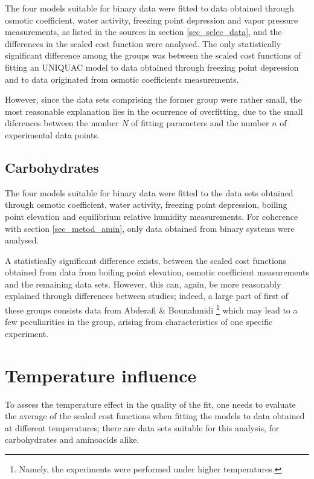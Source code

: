 \documentclass[
	12pt,				%
	openright,
	twoside,
	a4paper,			%
	brazil,			%
	french,				%
	english				%
	]{abntex2}
\begin{document}
\label{sec_metod_amin}

The four models suitable for binary data were fitted to data obtained through
osmotic coefficient, water activity, freezing point depression and vapor pressure
measurements, as listed in the sources in section \ref{sec_selec_data}, and the
differences in the scaled cost function were analysed. The only statistically
significant difference among the groups was between the scaled cost functions of
fitting an UNIQUAC model to data obtained through freezing point depression and
to data originated from osmotic coefficients measurements.

However, since the data sets comprising the former group were rather small, the
most reasonable explanation lies in the ocurrence of overfitting, due to the small
diferences between the number $N$ of fitting parameters and the number $n$ of
experimental data points.

\subsection{Carbohydrates}

The four models suitable for binary data were fitted to the data sets obtained
through osmotic coefficient, water activity, freezing point depression, boiling
point elevation and equilibrium relative humidity measurements. For coherence with
section \ref{sec_metod_amin}, only data obtained from binary systems were analysed.

A statistically significant difference exists, between the scaled cost functions
obtained from data from boiling point elevation, osmotic coefficient measurements
and the remaining data sets. However, this can, again, be more reasonably explained
through differences between studies; indeed, a large part of first of these
groups consists data from Abderafi \& Bounahmidi \footnote{Namely, the experiments
were performed under higher temperatures.} \cite{abderafi1994} which may lead to
a few peculiarities in the group, arising from characteristics of one specific
experiment.

\section{Temperature influence}

To assess the temperature effect in the quality of the fit, one needs to
evaluate the average of the scaled cost functions when fitting the models
to data obtained at different temperatures; there are data sets suitable
for this analysis, for carbohydrates \cite{velezmoro2000} and aminoacids
\cite{romero2006,tsurko2007} alike.
\end{document}
